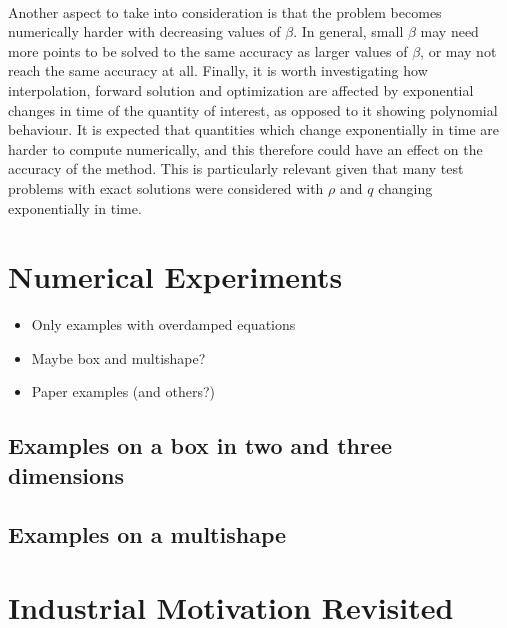 \documentclass[11pt, a4paper]{article}
\theoremstyle{definition}
\newcommand{\adj}{q}
\begin{document}
	\\
	Another aspect to take into consideration is that the problem becomes numerically harder with decreasing values of $\beta$. In general, small $\beta$ may need more points to be solved to the same accuracy as larger values of $\beta$, or may not reach the same accuracy at all.  Finally, it is worth investigating how interpolation, forward solution and optimization are affected by exponential changes in time of the quantity of interest, as opposed to it showing polynomial behaviour. It is expected that quantities which change exponentially in time are harder to compute numerically, and this therefore could have an effect on the accuracy of the method. This is particularly relevant given that many test problems with exact solutions were considered with $\rho$ and $\adj$ changing exponentially in time.








	\section{Numerical Experiments}
		\begin{itemize}
			\item Only examples with overdamped equations
			\item Maybe box and multishape?
			\item Paper examples (and others?)
		\end{itemize}
	
	\subsection{Examples on a box in two and three dimensions}
	
	\subsection{Examples on a multishape}
	
	
	
	
	
	
	\section{Industrial Motivation Revisited}
\end{document}
